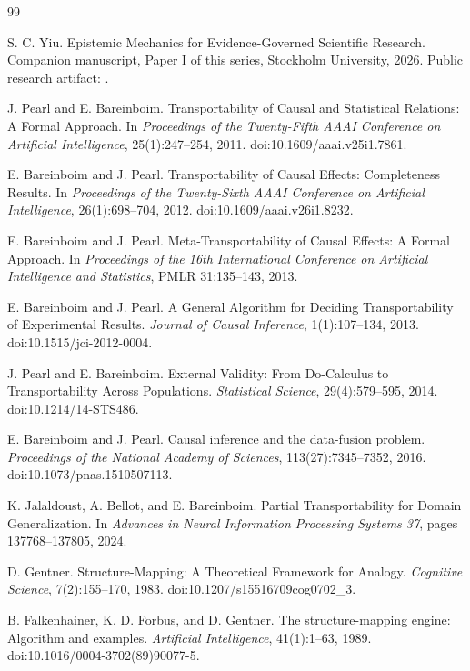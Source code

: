 \begin{thebibliography}{99}

S. C. Yiu. Epistemic Mechanics for Evidence-Governed Scientific Research. Companion manuscript, Paper I of this series, Stockholm University, 2026. Public research artifact: .

J. Pearl and E. Bareinboim. Transportability of Causal and Statistical Relations: A Formal Approach. In \emph{Proceedings of the Twenty-Fifth AAAI Conference on Artificial Intelligence}, 25(1):247--254, 2011. doi:10.1609/aaai.v25i1.7861.

E. Bareinboim and J. Pearl. Transportability of Causal Effects: Completeness Results. In \emph{Proceedings of the Twenty-Sixth AAAI Conference on Artificial Intelligence}, 26(1):698--704, 2012. doi:10.1609/aaai.v26i1.8232.

E. Bareinboim and J. Pearl. Meta-Transportability of Causal Effects: A Formal Approach. In \emph{Proceedings of the 16th International Conference on Artificial Intelligence and Statistics}, PMLR 31:135--143, 2013.

E. Bareinboim and J. Pearl. A General Algorithm for Deciding Transportability of Experimental Results. \emph{Journal of Causal Inference}, 1(1):107--134, 2013. doi:10.1515/jci-2012-0004.

J. Pearl and E. Bareinboim. External Validity: From Do-Calculus to Transportability Across Populations. \emph{Statistical Science}, 29(4):579--595, 2014. doi:10.1214/14-STS486.

E. Bareinboim and J. Pearl. Causal inference and the data-fusion problem. \emph{Proceedings of the National Academy of Sciences}, 113(27):7345--7352, 2016. doi:10.1073/pnas.1510507113.

K. Jalaldoust, A. Bellot, and E. Bareinboim. Partial Transportability for Domain Generalization. In \emph{Advances in Neural Information Processing Systems 37}, pages 137768--137805, 2024.

D. Gentner. Structure-Mapping: A Theoretical Framework for Analogy. \emph{Cognitive Science}, 7(2):155--170, 1983. doi:10.1207/s15516709cog0702\_3.

B. Falkenhainer, K. D. Forbus, and D. Gentner. The structure-mapping engine: Algorithm and examples. \emph{Artificial Intelligence}, 41(1):1--63, 1989. doi:10.1016/0004-3702(89)90077-5.


\end{thebibliography}
